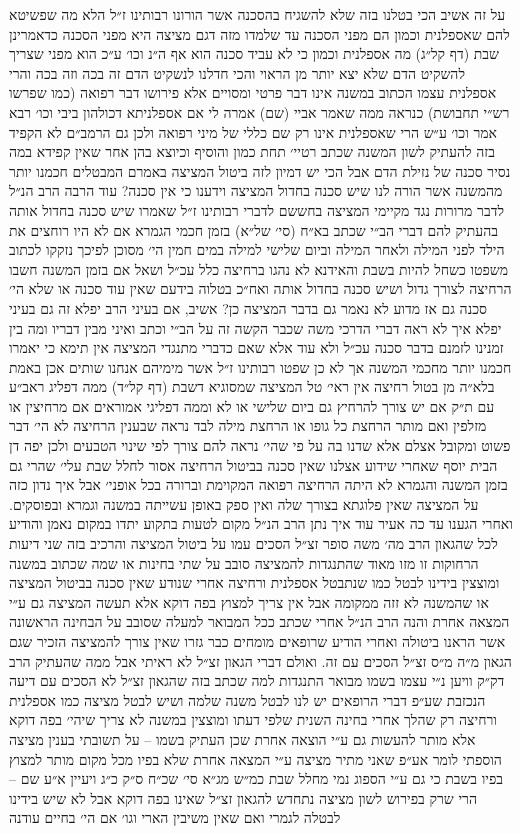 \documentclass[12pt, openany]{book}
\begin{document}
\begin{multicols}{2}
על זה אשיב הכי בטלנו בזה שלא להשגיח בהסכנה אשר הורונו רבותינו ז״ל הלא מה שפשיטא להם שאספלנית וכמון הם מפני הסכנה עד שלמדו מזה דגם מציצה היא מפני הסכנה כדאמרינן שבת (דף קל״ג) מה אספלנית וכמון כי לא עביד סכנה הוא אף ה״נ וכו׳ ע״כ הוא מפני שצריך להשקיט הדם שלא יצא יותר מן הראוי והכי חדלנו לנשקיט הדם זה בכה וזה בכה והרי אספלנית עצמו הכתוב במשנה אינו דבר פרטי ומסויים אלא פירושו דבר רפואה (כמו שפרשו רש״י תחבושת) כנראה ממה שאמר אביי (שם) אמרה לי אם אספלניתא דכולהון ביבי וכו׳ רבא אמר וכו׳ ע״ש הרי שאספלנית אינו רק שם כללי של מיני רפואה ולכן גם הרמב״ם לא הקפיד בזה להעתיק לשון המשנה שכתב רטיי׳ תחת כמון והוסיף וכיוצא בהן אחר שאין קפידא במה נסיר סכנה של נזילת הדם אבל הכי יש דמיון לזה ביטול המציצה באמרם המבטלים חכמנו יותר מהמשנה אשר הורה לנו שיש סכנה בחדול המציצה וידענו כי אין סכנה? עוד הרבה הרב הנ״ל לדבר מרורות נגד מקיימי המציצה בחששם לדברי רבותינו ז״ל שאמרו שיש סכנה בחדול אותה בהעתיק להם דברי הב״י שכתב בא״ח (סי׳ של״א) בזמן חכמי הגמרא אם לא היו רוחצים את הילד לפני המילה ולאחר המילה וביום שלישי למילה במים חמין הי׳ מסוכן לפיכך נזקקו לכתוב משפטו כשחל להיות בשבת והאידנא לא נהגו ברחיצה כלל עכ״ל ושאל אם בזמן המשנה חשבו הרחיצה לצורך גדול ושיש סכנה בחדול אותה ואח״כ בטלוה בידעם שאין עוד סכנה או שלא הי׳ סכנה גם אז מדוע לא נאמר גם בדבר המציצה כן? אשיב, אם בעיני הרב יפלא זה גם בעיני יפלא איך לא ראה דברי הדרכי משה שכבר הקשה זה על הב״י וכתב ואיני מבין דבריו ומה בין זמנינו לזמנם בדבר סכנה עכ״ל ולא עוד אלא שאם כדברי מתנגדי המציצה אין תימא כי יאמרו חכמנו יותר מחכמי המשנה אך לא כן שפטו רבותינו ז״ל אשר מימיהם אנחנו שותים אכן באמת בלא״ה מן בטול רחיצה אין ראי׳ טל המציצה שמסוגיא דשבת (דף קל״ד) ממה דפליג ראב״ע עם ת״ק אם יש צורך להרחיץ גם ביום שלישי או לא וממה דפליגי אמוראים אם מרחיצין או מזלפין ואם מותר הרחצת כל גופו או הרחצת מילה לבד נראה שבענין הרחיצה לא הי׳ דבר פשוט ומקובל אצלם אלא שדנו בה על פי שהי׳ נראה להם צורך לפי שינוי הטבעים ולכן יפה דן הבית יוסף שאחרי שידוע אצלנו שאין סכנה בביטול הרחיצה אסור לחלל שבת עלי׳ שהרי גם בזמן המשנה והגמרא לא היתה הרחיצה רפואה המקוימת וברורה בכל אופני׳ אבל איך נדון כזה על המציצה שאין פלוגתא בצורך שלה ואין ספק באופן עשייתה במשנה וגמרא ובפוסקים. ואחרי הגענו עד כה אעיר עוד איך נתן הרב הנ״ל מקום לטעות בתקוע יתדו במקום נאמן והודיע לכל שהגאון הרב מה׳ משה סופר זצ״ל הסכים עמו על ביטול המציצה והרכיב בזה שני דיעות הרחוקות זו מזו מאוד שהתנגדות להמציצה סובב על שתי בחינות או שמה שכתוב במשנה ומוצצין בידינו לבטל כמו שנתבטל אספלנית ורחיצה אחרי שנודע שאין סכנה בביטול המציצה או שהמשנה לא זזה ממקומה אבל אין צריך למצוץ בפה דוקא אלא תעשה המציצה גם ע״י המצאה אחרת והנה הרב הנ״ל אחרי שכתב ככל המבואר למעלה שסובב על הבחינה הראשונה אשר הראנו ביטולה ואחרי הודיע שרופאים מומחים כבר גזרו שאין צורך להמציצה הזכיר שגם הגאון מ״ה מ״ס זצ״ל הסכים עם זה. ואולם דברי הגאון זצ״ל לא ראיתי אבל ממה שהעתיק הרב דק״ק וויען נ״י עצמו בשמו מבואר התנגדות למה שכתב בזה שהגאון זצ״ל לא הסכים עם דיעה הנכזבת שע״פ דברי הרופאים יש לנו לבטל משנה שלמה ושיש לבטל מציצה כמו אספלנית ורחיצה רק שהלך אחרי בחינה השנית שלפי דעתו ומוצצין במשנה לא צריך שיהי׳ בפה דוקא אלא מותר להעשות גם ע״י הוצאה אחרת שכן העתיק בשמו – על תשובתי בענין מציצה הוספתי לומר אע״פ שאני מתיר מציצה ע״י המצאה אחרת שלא בפיו מכל מקום מותר למצוץ בפיו בשבת כי גם ע״י הספוג נמי מחלל שבת כמ״ש מג״א סי׳ שכ״ח ס״ק כ״ג ויעיין א״ע שם – הרי שרק בפירוש לשון מציצה נתחדש להגאון זצ״ל שאינו בפה דוקא אבל לא שיש בידינו לבטלה לגמרי ואם שאין משיבין הארי וגו׳ אם הי׳ בחיים עודנה 
\end{multicols}
\end{document}
